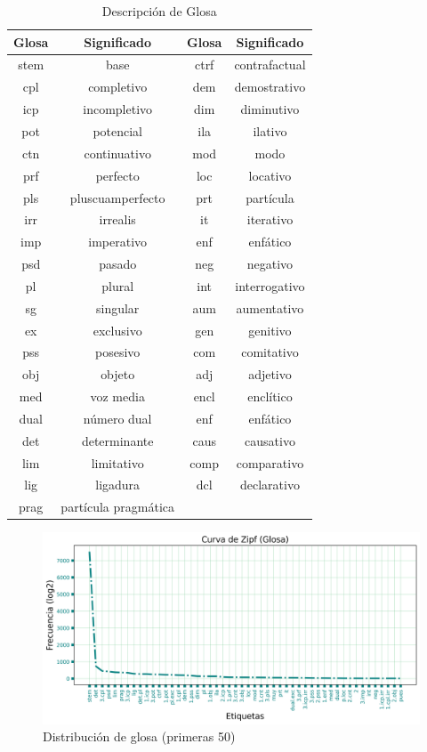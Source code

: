 \documentclass[letterpaper,12pt,oneside]{book}
\theoremstyle{definition}
\begin{document}
\begin{table}
	\centering
	\begin{tabular}{ c  c | c  c }
		\textbf{Glosa} & \textbf{Significado} & \textbf{Glosa} & \textbf{Significado}\\\hline
		stem & base & ctrf & contrafactual \\
        cpl & completivo & dem & demostrativo \\
        icp & incompletivo & dim & diminutivo \\
        pot & potencial & ila & ilativo \\
        ctn & continuativo & mod & modo \\
        prf & perfecto & loc & locativo \\
        pls & pluscuamperfecto & prt & partícula \\
        irr & irrealis & it & iterativo \\
        imp & imperativo & enf & enfático \\
        psd & pasado & neg & negativo \\
        pl & plural & int & interrogativo \\
        sg & singular & aum & aumentativo \\
        ex & exclusivo & gen & genitivo \\
        pss & posesivo & com & comitativo \\
        obj & objeto & adj & adjetivo \\
        med & voz media & encl & enclítico \\
        dual & número dual & enf & enfático \\
        det & determinante & caus & causativo \\
        lim & limitativo & comp & comparativo \\
        lig & ligadura & dcl & declarativo \\
        prag & partícula pragmática & \\ \hline
	\end{tabular}
	\caption{Descripción de Glosa}
	\label{table:gloss_desc}
\end{table}
	

\begin{figure}
	\centering
	\includegraphics[width=\textwidth]{zipf_gloss}
	\caption{Distribución de glosa (primeras 50)}
	\label{fig:gloss_distrib}
\end{figure}
\end{document}
